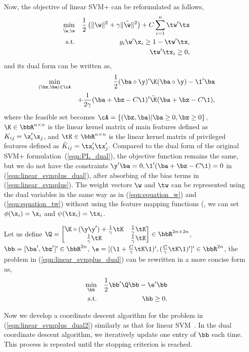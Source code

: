 Now, the objective of linear SVM+ can be reformulated as follows,
\begin{eqnarray}\label{eqn:linear_svmplus}
\min_{\tilde{\w}, \w} && \frac{1}{2}\left(\|\w\|^2 + \gamma\|\tilde{\w}\|^2\right)+ C\sum_{i=1}^{n}\tw'\tx\\
\mbox{s.t.} && y_i\w'\x_i \geq 1 - \tw'\tx,\nonumber\\
&& \tw'\tx_i \geq 0,\nonumber
\end{eqnarray}
and its dual form can be written as,
\begin{eqnarray}\label{eqn:linear_svmplus_dual}
\min_{(\bz, \ba) \in \cA} && \frac{1}{2}(\ba\circ\y)'\K(\ba\circ\y) -\1'\ba  \\
&&  + \frac{1}{2\gamma}(\ba + \bz - C\1)'\tilde{\K}(\ba + \bz - C\1),\nonumber
\end{eqnarray}
where the feasible set becomes $\cA = \{(\bz, \ba)| \ba \geq 0, \bz \geq 0\}$, $\K \in \bbR^{n\times n}$ is the linear kernel matrix of main features defined as $K_{ij} = \x_i'\x_j$, and $\tK\in \bbR^{n\times n}$ is the linear kernel matrix of privileged features defined as $\tilde{K}_{ij} = \tx_i'\tx_j'$. Compared to the dual form of the original SVM+ formulation~(\ref{eqn:PL_dual}), the objective function remains the same, but we do not have the constraints $\y'\ba = 0, \1'(\ba+\bz-C\1) = 0$ in (\ref{eqn:linear_svmplus_dual}), after absorbing of the bias terms in (\ref{eqn:linear_svmplus}). The weight vectors $\w$ and $\tw$ can be represented using the dual variables in the same way as in (\ref{eqn:equation_w}) and (\ref{eqn:equation_tw}) without using the feature mapping functions (\ie, we can set $\phi(\x_i) = \x_i$ and $\psi(\tx_i) = \tx_i$.

Let us define $\Q = \begin{bmatrix}\K\circ(\y\y') + \frac{1}{\gamma}\tK & \frac{1}{\gamma}\tK\\ \frac{1}{\gamma}\tK & \frac{1}{\gamma}\tK\end{bmatrix} \in \bbR^{2n\times 2n}$, $\bb = [\ba', \bz']' \in \bbR^{2n}$, $\e = [(\1+\frac{C}{\gamma}\tK\1)', (\frac{C}{\gamma}\tK\1)']' \in \bbR^{2n}$, the problem in (\ref{eqn:linear_svmplus_dual}) can be rewritten in a more concise form as,
\begin{eqnarray}
\min_{\bb} && \frac{1}{2}\bb'\Q\bb -\e'\bb\label{eqn:linear_svmplus_dual2}\\
\mbox{s.t.}&& \bb \geq 0.\nonumber
\end{eqnarray}

Now we develop a coordinate descent algorithm for the problem in (\ref{eqn:linear_svmplus_dual2}) similarly as that for linear SVM~\cite{DCD_linearsvm}. In the dual coordinate descent algorithm, we iteratively update one entry of $\bb$ each time. This process is repeated until the stopping criterion is reached.

